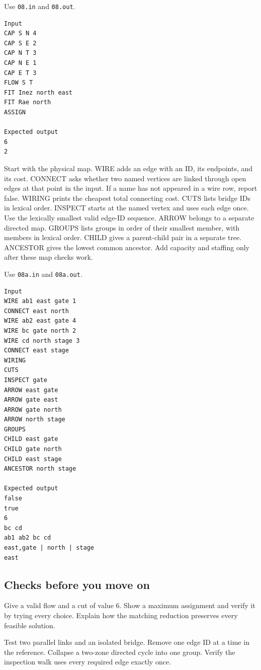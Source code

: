 \documentclass[11pt,letterpaper]{article}
\begin{document}
Use \texttt{08.in} and \texttt{08.out}.

\begin{samepage}
\small
\begin{verbatim}
Input
CAP S N 4
CAP S E 2
CAP N T 3
CAP N E 1
CAP E T 3
FLOW S T
FIT Inez north east
FIT Rae north
ASSIGN

Expected output
6
2
\end{verbatim}
\end{samepage}

Start with the physical map. WIRE adds an edge with an ID, its endpoints, and its cost. CONNECT asks whether two named vertices are linked through open edges at that point in the input. If a name has not appeared in a wire row, report false. WIRING prints the cheapest total connecting cost. CUTS lists bridge IDs in lexical order. INSPECT starts at the named vertex and uses each edge once. Use the lexically smallest valid edge-ID sequence. ARROW belongs to a separate directed map. GROUPS lists groups in order of their smallest member, with members in lexical order. CHILD gives a parent-child pair in a separate tree. ANCESTOR gives the lowest common ancestor. Add capacity and staffing only after these map checks work.

Use \texttt{08a.in} and \texttt{08a.out}.

\begin{samepage}
\small
\begin{verbatim}
Input
WIRE ab1 east gate 1
CONNECT east north
WIRE ab2 east gate 4
WIRE bc gate north 2
WIRE cd north stage 3
CONNECT east stage
WIRING
CUTS
INSPECT gate
ARROW east gate
ARROW gate east
ARROW gate north
ARROW north stage
GROUPS
CHILD east gate
CHILD gate north
CHILD east stage
ANCESTOR north stage

Expected output
false
true
6
bc cd
ab1 ab2 bc cd
east,gate | north | stage
east
\end{verbatim}
\end{samepage}

\subsection*{Checks before you move on}

Give a valid flow and a cut of value 6. Show a maximum assignment and verify it by trying every choice. Explain how the matching reduction preserves every feasible solution.

Test two parallel links and an isolated bridge. Remove one edge ID at a time in the reference. Collapse a two-zone directed cycle into one group. Verify the inspection walk uses every required edge exactly once.
\end{document}
